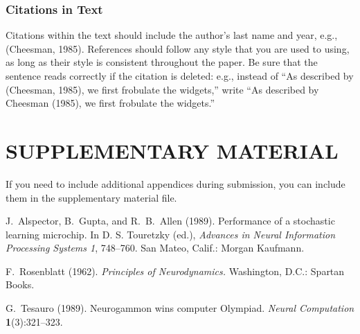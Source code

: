 \documentclass[twoside]{article}
\begin{document}






\subsubsection{Citations in Text}

Citations within the text should include the author's last name and
year, e.g., (Cheesman, 1985). References should follow any style that
you are used to using, as long as their style is consistent throughout
the paper.  Be sure that the sentence reads correctly if the citation
is deleted: e.g., instead of ``As described by (Cheesman, 1985), we
first frobulate the widgets,'' write ``As described by Cheesman
(1985), we first frobulate the widgets.''  %

\section{SUPPLEMENTARY MATERIAL}

If you need to include additional appendices during submission, you
can include them in the supplementary material file.




\begin{thebibliography}{}
\setlength{\itemindent}{-\leftmargin}
\makeatletter\renewcommand{\@biblabel}[1]{}\makeatother
\bibitem{} J.~Alspector, B.~Gupta, and R.~B.~Allen (1989).
    \newblock Performance of a stochastic learning microchip.
    \newblock In D. S. Touretzky (ed.),
    \textit{Advances in Neural Information Processing Systems 1}, 748--760.
    San Mateo, Calif.: Morgan Kaufmann.

\bibitem{} F.~Rosenblatt (1962).
    \newblock \textit{Principles of Neurodynamics.}
    \newblock Washington, D.C.: Spartan Books.

\bibitem{} G.~Tesauro (1989).
    \newblock Neurogammon wins computer Olympiad.
    \newblock \textit{Neural Computation} \textbf{1}(3):321--323.
\end{thebibliography}

\newpage
\appendix 

\end{document}
